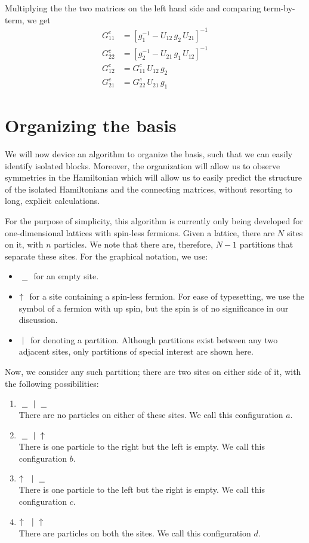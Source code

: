 	Multiplying the the two matrices on the left hand side and comparing term-by-term, we get
	\begin{align}
		G^{c}_{11} &= \left[ g^{-1}_{1} - U_{12}\,g_2\,U_{21}  \right]^{-1}\\
		G^{c}_{22} &= \left[ g^{-1}_{2} - U_{21}\,g_1\,U_{12}  \right]^{-1}\\
		G^{c}_{12} &= G^{c}_{11}\,U_{12}\,g_2\\
		G^{c}_{21} &= G^{c}_{22}\,U_{21}\,g_1
	\end{align}

\section{Organizing the basis}
	We will now device an algorithm to organize the basis, such that we can easily identify isolated blocks. Moreover, the organization will allow us to observe symmetries in the Hamiltonian which will allow us to easily predict the structure of the isolated Hamiltonians and the connecting matrices, without resorting to long, explicit calculations.
	
	For the purpose of simplicity, this algorithm is currently only being developed for one-dimensional lattices with spin-less fermions. Given a lattice, there are $ N $ sites on it, with $ n $ particles. We note that there are, therefore, $ N-1 $ partitions that separate these sites. For the graphical notation, we use:
	\begin{itemize}
		\item $ \ \underline{\ \ }\  $ for an empty site.
		\item $ \uparrow\  $ for a site containing a spin-less fermion. For ease of typesetting, we use the symbol of a fermion with up spin, but the spin is of no significance in our discussion.
		\item $ \ |\  $ for denoting a partition. Although partitions exist between any two adjacent sites, only partitions of special interest are shown here.
 	\end{itemize}
	
	Now, we consider any such partition; there are two sites on either side of it, with the following possibilities:
	\begin{enumerate}
		\item $ \ \underline{\ \ }\  \ |\  \ \underline{\ \ }\  $\\ 
		There are no particles on either of these sites. We call this configuration $ a $.
		\item  $ \ \underline{\ \ }\  \ |\  \uparrow\  $\\
		There is one particle to the right but the left is empty. We call this configuration $ b $.
		\item $ \uparrow\  \ |\  \ \underline{\ \ }\  $\\
		There is one particle to the left but the right is empty. We call this configuration $ c $.
		\item $ \uparrow\  \ |\  \uparrow\  $\\
		There are particles on both the sites. We call this configuration $ d $.
	\end{enumerate}
	
